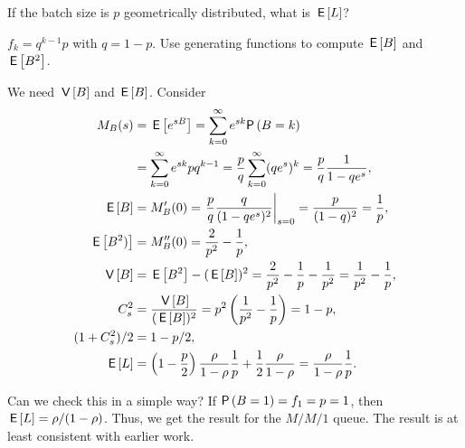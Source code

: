 \begin{exercise}
 If the batch size is $p$ geometrically distributed, what is $\,\mathsf{E}\left[L\right]$?
\begin{hint}
$f_k=q^{k-1}p$ with $q=1-p$. Use generating functions to compute $\,\mathsf{E}\left[B\right]$ and $\,\mathsf{E}\left[B^2\right]$.
\end{hint}
\begin{solution}
 We need $\,\mathsf{V}\left[B\right]$ and $\,\mathsf{E}\left[B\right]$. Consider
 \begin{align*}
 M_B(s) 
&= \E{e^{sB}} = \sum_{k=0}^\infty e^{sk} \P{B=k} \\
&= \sum_{k=0}^\infty e^{sk} p q^{k-1} 
= \frac p q \sum_{k=0}^\infty (q e^s)^k = \frac p q \frac1{1-qe^s},\\
 \E B &= M_B'(0) = \left.\frac p q \frac q{(1-q e^s)^2}\right|_{s=0}= \frac p{(1-q)^2} = \frac 1 p,\\
 \E{B^2)} &= M_B''(0) = \frac2{p^2} - \frac1p, \\
 \V B &= \E{B^2} - (\E B)^2 = \frac2{p^2} - \frac1p - \frac1{p^2} = \frac1{p^2}-\frac1p,\\
 C_s^2&= \frac{\V B}{(\E B)^2} = p^2 \left(\frac1{p^2}-\frac1p\right)=1-p,\\
 (1+C_s^2)/2 &= 1-p/2,\\
 \E L &= 
\left(1-\frac p2\right) \frac\rho{1-\rho} \frac 1 p + \frac12\frac\rho{1-\rho}
=\frac\rho{1-\rho} \frac 1 p.
\end{align*}

Can we check this in a simple way? If $\P{B=1}=f_1 = p =1$, then
$\,\mathsf{E}\left[L\right]=\rho/(1-\rho)$. Thus, we get the result for the $M/M/1$
queue. The result is at least consistent with earlier work.
\end{solution}
\end{exercise}

